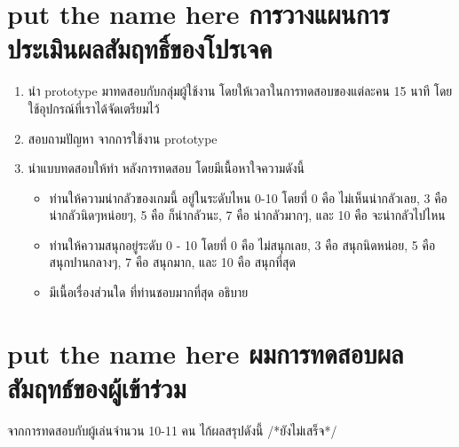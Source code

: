 \section{\ifenglish put the name here \else การวางแผนการประเมินผลสัมฤทธิ์ของโปรเจค\fi}
\begin{enumerate}
    \item นำ prototype มาทดสอบกับกลุ่มผู้ใช้งาน โดยให้เวลาในการทดสอบของแต่ละคน 15 นาที โดยใช้อุปกรณ์ที่เราได้จัดเตรียมไว้
    \item สอบถามปัญหา จากการใช้งาน prototype
    \item นำแบบทดสอบให้ทำ หลังการทดสอบ โดยมีเนื้อหาใจความดังนี้
    \begin{itemize}
        \item ท่านให้ความน่ากลัวของเกมนี้ อยู่ในระดับไหน 0-10 โดยที่ 0 คือ ไม่เห็นน่ากลัวเลย, 3 คือ น่ากลัวนิดๆหน่อยๆ, 5 คือ ก็น่ากลัวนะ, 7 คือ น่ากลัวมากๆ, และ 10 คือ จะน่ากลัวไปไหน
        \item ท่านให้ความสนุกอยู่ระดับ 0 - 10 โดยที่ 0 คือ ไม่สนุกเลย, 3 คือ สนุกนิดหน่อย, 5 คือ สนุกปานกลางๆ, 7 คือ สนุกมาก, และ 10 คือ สนุกที่สุด
        \item มีเนื้อเรื่องส่วนใด ที่ท่านชอบมากที่สุด อธิบาย
    \end{itemize}
\end{enumerate}
\section{\ifenglish put the name here \else ผมการทดสอบผลสัมฤทธ์ของผู้เข้าร่วม\fi}
จากการทดสอบกับผู้เล่นจำนวน 10-11 คน ไก้ผลสรุปดังนี้
/*ยังไม่เสร็จ*/

